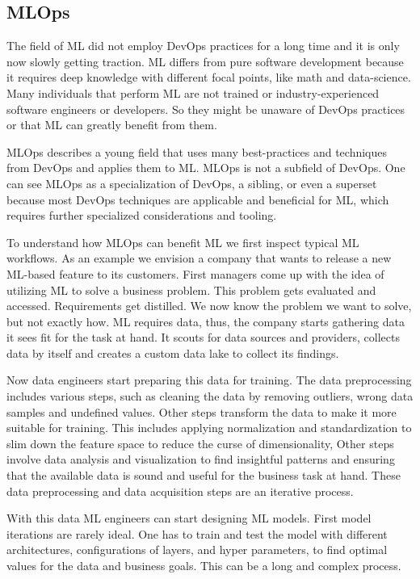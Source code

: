 \subsection{MLOps}

The field of ML did not employ DevOps practices for a long time and it is only now slowly getting traction.
ML differs from pure software development because it requires deep knowledge with different focal points,
like math and data-science.
Many individuals that perform ML are not trained or industry-experienced software engineers or developers.
So they might be unaware of DevOps practices or that ML can greatly benefit from them.

MLOps describes a young field that uses many best-practices and techniques from DevOps and applies them to ML.
MLOps is not a subfield of DevOps.
One can see MLOps as a specialization of DevOps, a sibling, or even a superset
because most DevOps techniques are applicable and beneficial for ML,
which requires further specialized considerations and tooling.

To understand how MLOps can benefit ML we first inspect typical ML workflows.
As an example we envision a company that wants to release a new ML-based feature to its customers.
First managers come up with the idea of utilizing ML to solve a business problem.
This problem gets evaluated and accessed.
Requirements get distilled.
We now know the problem we want to solve, but not exactly how.
ML requires data, thus, the company starts gathering data it sees fit for the task at hand.
It scouts for data sources and providers, collects data by itself and creates a custom data lake to collect its findings.

Now data engineers start preparing this data for training.
The data preprocessing includes various steps, such as cleaning the data by removing outliers, 
wrong data samples and undefined values.
Other steps transform the data to make it more suitable for training.
This includes applying normalization and standardization to
slim down the feature space to reduce the curse of dimensionality,
Other steps involve data analysis and visualization to find insightful 
patterns and ensuring that the available data is sound and useful for the business task at hand.
These data preprocessing and data acquisition steps are an iterative process.

With this data ML engineers can start designing ML models.
First model iterations are rarely ideal.
One has to train and test the model with different architectures, configurations of layers, and hyper parameters,
to find optimal values for the data and business goals.
This can be a long and complex process.


